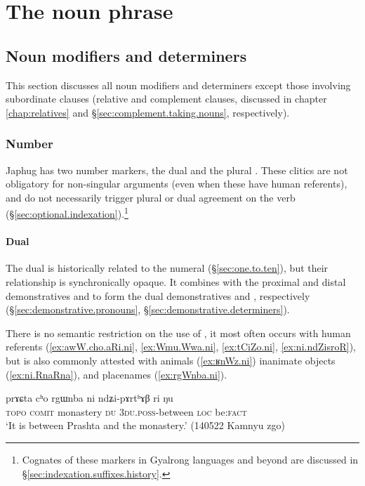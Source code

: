 \chapter{The noun phrase} \label{chap:noun.phrase}


\section{Noun modifiers and determiners} \label{sec:determiners}
This section discusses all noun modifiers and determiners except those involving subordinate clauses (relative and complement clauses, discussed in chapter \ref{chap:relatives} and §\ref{sec:complement.taking.nouns}, respectively). 
 
\subsection{Number}  \label{sec:number.determiners}
Japhug has two number markers, the dual  and the plural . These clitics are not obligatory for non-singular arguments (even when these have human referents), and do not necessarily trigger plural or dual agreement on the verb (§\ref{sec:optional.indexation}).\footnote{Cognates of these markers in Gyalrong languages and beyond are discussed in §\ref{sec:indexation.suffixes.history}. }

\subsubsection{Dual} \label{sec:dual.determiners}
 
The dual  is historically related to the numeral  (§\ref{sec:one.to.ten}), but their relationship is synchronically opaque. It combines with the proximal and distal demonstratives  and  to form the dual demonstratives  and , respectively (§\ref{sec:demonstrative.pronouns}, §\ref{sec:demonstrative.determiners}).

There is no semantic restriction on the use of , it most often occurs with human referents (\ref{ex:awW.cho.aRi.ni}, \ref{ex:Wmu.Wwa.ni}, \ref{ex:tCiZo.ni}, \ref{ex:ni.ndZisroR}), but is also commonly attested with animals (\ref{ex:ʁnWz.ni}) inanimate objects (\ref{ex:ni.RnaRna}), and placenames (\ref{ex:rgWnba.ni}). 

\begin{exe}
\ex \label{ex:rgWnba.ni}
\gll prɤɕta cʰo rgɯnba ni ndʑi-pɤrtʰɤβ ri ŋu \\
\textsc{topo} \textsc{comit} monastery \textsc{du} \textsc{3du}.\textsc{poss}-between \textsc{loc} be:\textsc{fact} \\
\glt `It is between Prashta and the monastery.' (140522 Kamnyu zgo)
\end{exe}

